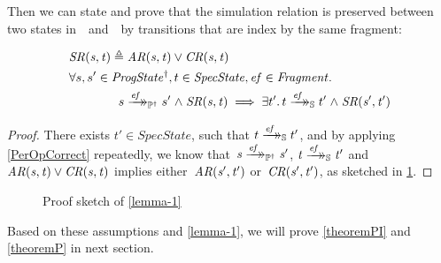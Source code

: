 Then we can state and prove that the simulation relation is preserved between two states in~\ProgInv\ and~\Spec\ by transitions that are index by the same fragment:
\begin{lemma}\label{lemma-1}
	\begin{align*}
		&\mathit{SR(s, t)} {}\triangleq{} \mathit{AR(s, t)} \lor \mathit{CR(s, t)}\\
		&\forall s, s' \in \mathit{ProgState^\dagger}, t \in \mathit{SpecState}, \mathit{ef} \in \mathit{Fragment} \ldotp\\
		&\qquad \qquad s \xrightarrow{\mathit{ef}}\mathrel{\mkern-14mu}\rightarrow_{\mathbb P^\dagger} s'  \mathrel\land \mathit{SR(s, t)} \implies \exists t' \ldotp t \xrightarrow{\mathit{ef}}\mathrel{\mkern-14mu}\rightarrow_{\mathbb S} t' \mathrel\land \mathit{SR(s', t')} \\
	\end{align*}
\end{lemma}
	\begin{onehalfspacing}
\begin{proof}
	There exists $t' \in SpecState$, such that $t \xrightarrow{\mathit{ef}}\mathrel{\mkern-14mu}\rightarrow_{\mathbb S} t'$, and by applying \cref{PerOpCorrect} repeatedly, we know that~$\mathit{s \xrightarrow{\mathit{ef}}\mathrel{\mkern-14mu}\rightarrow_{\mathbb P^\dagger} s'}$, $\mathit{t \xrightarrow{\mathit{ef}}\mathrel{\mkern-14mu}\rightarrow_{\mathbb S} t'}$ and~$\mathit{AR(s, t)} \lor \mathit{CR(s, t)}$ implies either~$\mathit{AR(s', t')}$ or~$\mathit{CR(s', t')}$, as sketched in \cref{fig:sketch1}.
\end{proof}
	\end{onehalfspacing}
	\begin{figure}[h] \centering
{}
		\caption{Proof sketch of \cref{lemma-1}}
\label{fig:sketch1}
	\end{figure}
Based on these assumptions and \cref{lemma-1}, we will prove \cref{theoremPI} and \cref{theoremP} in next section.